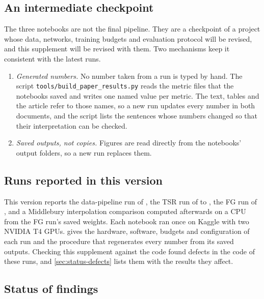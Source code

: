\subsection{An intermediate checkpoint}\label{sec:overview-checkpoint}

The three notebooks are not the final pipeline. They are a checkpoint of a project whose data, networks, training budgets and evaluation protocol will be revised, and this supplement will be revised with them. Two mechanisms keep it consistent with the latest runs.

\begin{enumerate}
\item \emph{Generated numbers.} No number taken from a run is typed by hand. The script \texttt{tools/build\_paper\_results.py} reads the metric files that the notebooks saved and writes one named value per metric. The text, tables and the article refer to those names, so a new run updates every number in both documents, and the script lists the sentences whose numbers changed so that their interpretation can be checked.
\item \emph{Saved outputs, not copies.} Figures are read directly from the notebooks' output folders, so a new run replaces them.
\end{enumerate}

\subsection{Runs reported in this version}\label{sec:overview-runs}

This version reports the data-pipeline run of , the TSR run of  to , the FG run of , and a Middlebury interpolation comparison computed afterwards on a CPU from the FG run's saved weights. Each notebook ran once on Kaggle with two NVIDIA T4 GPUs.  gives the hardware, software, budgets and configuration of each run and the procedure that regenerates every number from its saved outputs. Checking this supplement against the code found defects in the code of these runs, and \cref{sec:status-defects} lists them with the results they affect.

\subsection{Status of findings}\label{sec:status-legend}


